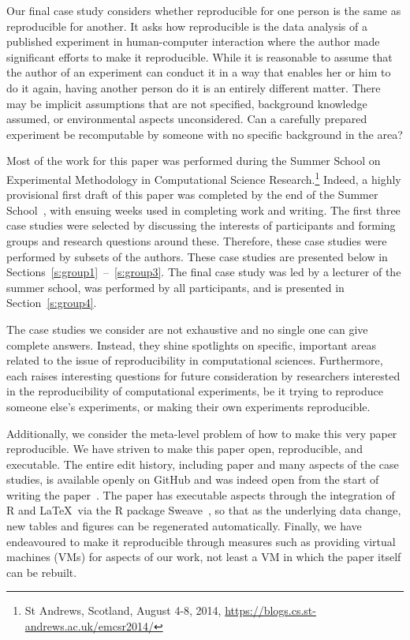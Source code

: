 Our final case study considers whether reproducible for one person is the same
as reproducible for another. It asks how reproducible is the data analysis of a
published experiment in human-computer interaction where the author made
significant efforts to make it reproducible. While it is reasonable to assume
that the author of an experiment can conduct it in a way that enables her or him
to do it again, having another person do it is an entirely different matter.
There may be implicit assumptions that are not specified, background knowledge
assumed, or environmental aspects unconsidered. Can a carefully prepared
experiment be recomputable by someone with no specific background in the area?

Most of the work for this paper was performed during the Summer School on
Experimental Methodology in Computational Science Research.\footnote{St
Andrews, Scotland, August 4-8, 2014,
\url{https://blogs.cs.st-andrews.ac.uk/emcsr2014/}}
Indeed, a highly
provisional first draft of this paper was completed by the end of the Summer
School~\cite{emcsr_arxiv_draft}, with ensuing weeks used in completing work and writing.  
The first three case studies
were selected by discussing the interests of participants and forming groups
and research questions around these. Therefore, these case studies were
performed by subsets of the authors. These case studies are
presented below in Sections~\ref{s:group1}~--~\ref{s:group3}. The final case
study was led by a lecturer of the summer school, was performed by all
participants, and is presented in Section~\ref{s:group4}.

The case studies we consider are not exhaustive and no single one can give
complete answers. Instead, they shine spotlights on specific, important areas
related to the issue of reproducibility in computational sciences. Furthermore,
each raises interesting questions for future consideration by researchers
interested in the reproducibility of computational experiments, be it trying to
reproduce someone else's experiments, or making their own experiments
reproducible.

Additionally, we consider the meta-level problem of how to make this very paper
reproducible. We have striven to make this paper open, reproducible, and
executable.
The entire edit history, including paper and many aspects of the
case studies, is available openly on
GitHub
and was indeed open from the start
of writing the paper~\cite{summerschoolpaper}.
The paper has executable aspects through the integration of R
and \LaTeX\ via the R package Sweave~\cite{lmucs-papers:Leisch:2002}, so that as the underlying
data change, new tables and figures can be regenerated automatically. Finally,
we have endeavoured to make it reproducible through measures such as providing
virtual machines (VMs) for aspects of our work, not least a VM in which
the paper itself can be rebuilt.

